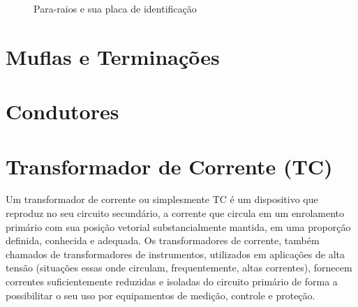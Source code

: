\documentclass[a5paper,english,spanish,brazil]{ufsc-thesis}
\begin{document}
		\begin{figure}[htb]
			\caption{Para-raios e sua placa de identificação}
			\centering
		\end{figure}

	\section{Muflas e Terminações}

	\section{Condutores}

	\section{Transformador de Corrente (TC)}
		Um transformador de corrente ou simplesmente TC é um dispositivo que reproduz no seu circuito secundário, a corrente que circula em um enrolamento primário com sua posição vetorial substancialmente mantida, em uma proporção definida, conhecida e adequada. Os transformadores de corrente, também chamados de transformadores de instrumentos, utilizados em aplicações de alta tensão (situações essas onde circulam, frequentemente, altas correntes), fornecem correntes suficientemente reduzidas e isoladas do circuito primário de forma a possibilitar o seu uso por equipamentos de medição, controle e proteção.
\end{document}
